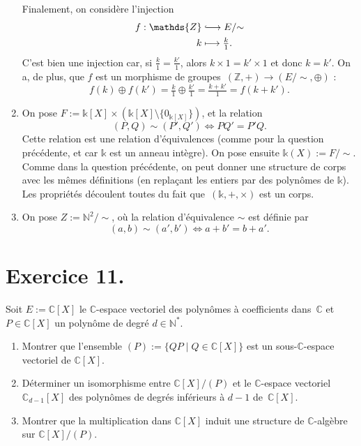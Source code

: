 \documentclass[./main]{subfiles}
\begin{document}
\begin{enumerate}
      Finalement, on considère l'injection
      \begin{align*}
        f: \mathds{Z} &\lhook\joinrel\longrightarrow E/{\sim} \\
        k &\longmapsto \tfrac{k}{1}
      .\end{align*}
      C'est bien une injection car, si $\tfrac{k}{1} = \tfrac{k'}{1}$, alors $k \times 1 = k' \times 1$ et donc $k = k'$.
      On a, de plus, que  $f$ est un morphisme de groupes~$(\mathds{Z}, +) \to (E/{\sim}, \oplus)$ : \[
        f(k) \oplus f(k') = \tfrac{k}{1} \oplus \tfrac{k'}{1} = \tfrac{k + k'}{1} = f(k + k')
      .\]
    \item On pose $F := \mathds{k}[X] \times (\mathds{k}[X] \setminus \{0_{\mathds{k}[X]}\})$, et la relation \[
        (P, Q) \sim (P', Q') \iff P Q' = P' Q
      .\]
      Cette relation est une relation d'équivalences (comme pour la question précédente, et car $\mathds{k}$ est un anneau intègre).
      On pose ensuite $\mathds{k}(X) := F / {\sim}$.
      Comme dans la question précédente, on peut donner une structure de corps avec les mêmes définitions (en replaçant les entiers par des polynômes de $\mathds{k}$).
      Les propriétés découlent toutes du fait que~$(\mathds{k}, +, \times)$ est un corps.
    \item On pose $Z := \mathds{N}^2 / {\sim}$, où la relation d'équivalence $\sim$ est définie par \[
        (a,b) \sim (a', b') \iff a + b' = b + a'
      .\]
  \end{enumerate}

  \section{Exercice 11.}

  \begin{enonce}
    Soit $E := \mathds{C}[X]$ le $\mathds{C}$-espace vectoriel des polynômes à coefficients dans~$\mathds{C}$ et $P \in \mathds{C}[X]$ un polynôme de degré $d \in \mathds{N}^*$.
    \begin{enumerate}
      \item Montrer que l'ensemble $(P) := \{Q P  \mid Q \in \mathds{C}[X]\}$ est un sous-$\mathds{C}$-espace vectoriel de $\mathds{C}[X]$.
      \item Déterminer un isomorphisme entre $\mathds{C}[X] / (P)$ et le $\mathds{C}$-espace vectoriel $\mathds{C}_{d-1}[X]$ des polynômes de degrés inférieurs à $d-1$ de~$\mathds{C}[X]$.
      \item Montrer que la multiplication dans $\mathds{C}[X]$ induit une structure de $\mathds{C}$-algèbre sur $\mathds{C}[X] / (P)$.
    \end{enumerate}
  \end{enonce}
\end{document}
